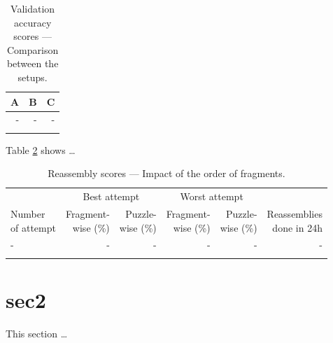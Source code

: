 \begin{table}
    \centering
    \begin{tabular}{rrr}
        \toprule
        A & B & C \\
        \midrule
        - & - & - \\
        \bottomrule \\                           %
    \end{tabular}
    \caption[Validation accuracy --- Comparison between the setups]{Validation accuracy scores --- Comparison between the setups.}
    \label{tab:res1:tab1}
\end{table}

Table \ref{tab:res1:tab2} shows … \blindtext

\begin{table}
  \centering
  \begin{tabular}{lrrrrr}
    \toprule
     &
    \multicolumn{2}{c}{Best attempt} &
    \multicolumn{2}{c}{Worst attempt} & \\
    \cmidrule(r){2-3}
    \cmidrule(r){4-5}
    \shortstack{Number \\ of attempt} & 
    \shortstack{Fragment-\\wise (\%)} & \shortstack{Puzzle-\\wise (\%)} &
    \shortstack{Fragment-\\wise (\%)} & \shortstack{Puzzle-\\wise (\%)} & \shortstack{Reassemblies\\done in 24h}\\
    \midrule
    - & - & - & - & - & - \\
    \bottomrule \\                              %
  \end{tabular}
  \caption[Reassembly --- Comparison of the order of fragments]{Reassembly scores --- Impact of the order of fragments.}
  \label{tab:res1:tab2}
\end{table}


\section{sec2}
\label{sec:res1:sec2}
This section …